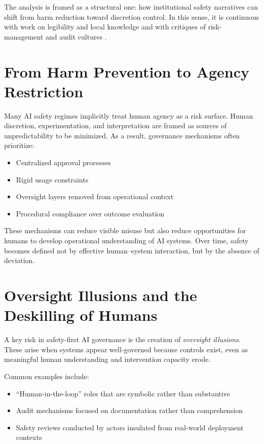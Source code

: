 \documentclass[11pt]{article}
\begin{document}
The analysis is framed as a structural one: how institutional safety narratives can
shift from harm reduction toward discretion control. In this sense, it is continuous
with work on legibility and local knowledge \citep{Scott1998Seeing} and with critiques
of risk-management and audit cultures \citep{Power2004Risk}.

\section{From Harm Prevention to Agency Restriction}

Many AI safety regimes implicitly treat human agency as a risk surface. Human
discretion, experimentation, and interpretation are framed as sources of
unpredictability to be minimized. As a result, governance mechanisms often prioritize:

\begin{itemize}
  \item Centralized approval processes
  \item Rigid usage constraints
  \item Oversight layers removed from operational context
  \item Procedural compliance over outcome evaluation
\end{itemize}

These mechanisms can reduce visible misuse but also reduce opportunities for humans to
develop operational understanding of AI systems. Over time, safety becomes defined not
by effective human--system interaction, but by the absence of deviation.

\section{Oversight Illusions and the Deskilling of Humans}

A key risk in safety-first AI governance is the creation of \emph{oversight illusions}.
These arise when systems appear well-governed because controls exist, even as
meaningful human understanding and intervention capacity erode.

Common examples include:

\begin{itemize}
  \item ``Human-in-the-loop'' roles that are symbolic rather than substantive
  \item Audit mechanisms focused on documentation rather than comprehension
  \item Safety reviews conducted by actors insulated from real-world deployment contexts
\end{itemize}
\end{document}
